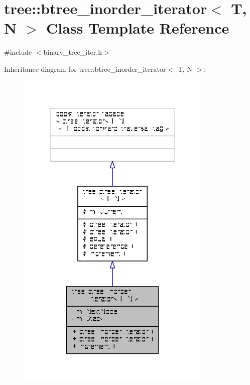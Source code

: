 \hypertarget{classtree_1_1btree__inorder__iterator}{\section{tree\-:\-:btree\-\_\-inorder\-\_\-iterator$<$ T, N $>$ Class Template Reference}
\label{classtree_1_1btree__inorder__iterator}
}


{\ttfamily \#include $<$binary\-\_\-tree\-\_\-iter.\-h$>$}



Inheritance diagram for tree\-:\-:btree\-\_\-inorder\-\_\-iterator$<$ T, N $>$\-:
\nopagebreak
\begin{figure}[H]
\begin{center}
\leavevmode
\includegraphics[width=264pt]{classtree_1_1btree__inorder__iterator__inherit__graph}
\end{center}
\end{figure}


